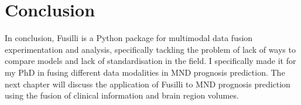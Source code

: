 \section{Conclusion}
In conclusion, Fusilli is a Python package for multimodal data fusion experimentation and analysis, specifically tackling the problem of lack of ways to compare models and lack of standardisation in the field.
I specifically made it for my PhD in fusing different data modalities in MND prognosis prediction.
The next chapter will discuss the application of Fusilli to MND prognosis prediction using the fusion of clinical information and brain region volumes.
